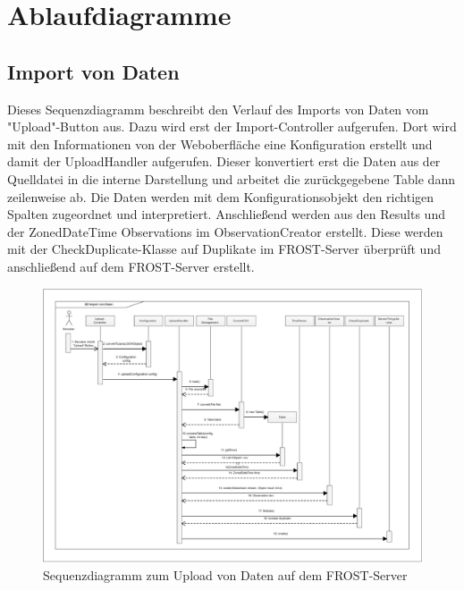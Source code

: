 \section{Ablaufdiagramme}

\subsection{Import von Daten}

Dieses Sequenzdiagramm beschreibt den Verlauf des Imports von Daten vom "Upload"-Button aus.
Dazu wird erst der Import-Controller aufgerufen.
Dort wird mit den Informationen von der Weboberfläche eine Konfiguration erstellt und damit der UploadHandler aufgerufen.
Dieser konvertiert erst die Daten aus der Quelldatei in die interne Darstellung und arbeitet die zurückgegebene Table dann zeilenweise ab.
Die Daten werden mit dem Konfigurationsobjekt den richtigen Spalten zugeordnet und interpretiert.
Anschließend werden aus den Results und der ZonedDateTime Observations im ObservationCreator erstellt.
Diese werden mit der CheckDuplicate-Klasse auf Duplikate im FROST-Server überprüft und anschließend auf dem FROST-Server erstellt.

\begin{figure}[htbp]
\centering
\includegraphics[scale=0.44]{uml/SD_upload.eps}
\caption{Sequenzdiagramm zum Upload von Daten auf dem FROST-Server}
\end{figure}